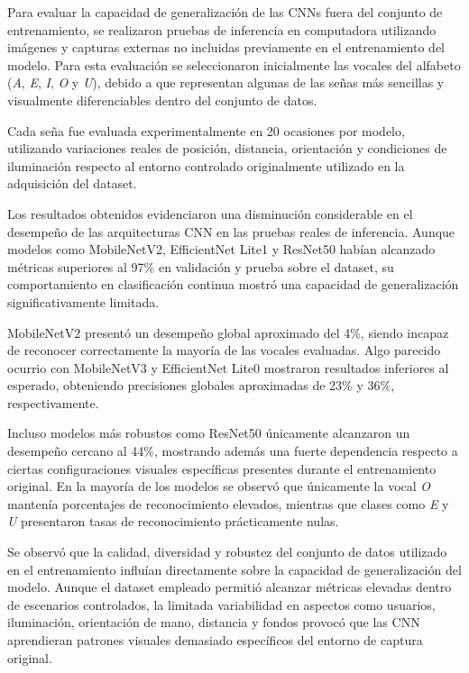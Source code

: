 	
	Para evaluar la capacidad de generalización de las CNNs fuera del conjunto de entrenamiento, se realizaron pruebas de inferencia en computadora utilizando imágenes y capturas externas no incluidas previamente en el entrenamiento del modelo. Para esta evaluación se seleccionaron inicialmente las vocales del alfabeto (\textit{A}, \textit{E}, \textit{I}, \textit{O} y \textit{U}), debido a que representan algunas de las señas más sencillas y visualmente diferenciables dentro del conjunto de datos.

	Cada seña fue evaluada experimentalmente en 20 ocasiones por modelo, utilizando variaciones reales de posición, distancia, orientación y condiciones de iluminación respecto al entorno controlado originalmente utilizado en la adquisición del dataset.
	
	Los resultados obtenidos evidenciaron una disminución considerable en el desempeño de las arquitecturas CNN en las pruebas reales de inferencia. Aunque modelos como MobileNetV2, EfficientNet Lite1 y ResNet50 habían alcanzado métricas superiores al 97\% en validación y prueba sobre el dataset, su comportamiento en clasificación continua mostró una capacidad de generalización significativamente limitada.
	
	MobileNetV2 presentó un desempeño global aproximado del 4\%, siendo incapaz de reconocer correctamente la mayoría de las vocales evaluadas. Algo parecido ocurrio con  MobileNetV3 y EfficientNet Lite0 mostraron resultados inferiores al esperado, obteniendo precisiones globales aproximadas de 23\% y 36\%, respectivamente.
	
	Incluso modelos más robustos como ResNet50 únicamente alcanzaron un desempeño cercano al 44\%, mostrando además una fuerte dependencia respecto a ciertas configuraciones visuales específicas presentes durante el entrenamiento original. En la mayoría de los modelos se observó que únicamente la vocal \textit{O} mantenía porcentajes de reconocimiento elevados, mientras que clases como \textit{E} y \textit{U} presentaron tasas de reconocimiento prácticamente nulas.
	
	Se observó que la calidad, diversidad y robustez del conjunto de datos utilizado en el entrenamiento influían directamente sobre la capacidad de generalización del modelo. Aunque el dataset empleado permitió alcanzar métricas elevadas dentro de escenarios controlados, la limitada variabilidad en aspectos como usuarios, iluminación, orientación de mano, distancia y fondos provocó que las CNN aprendieran patrones visuales demasiado específicos del entorno de captura original.
	
